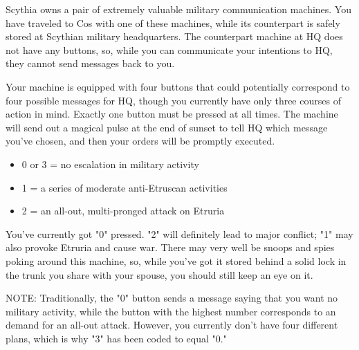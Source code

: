 \documentclass[green]{Kos}
\begin{document}
\name{\gScythiaMachine{}}

Scythia owns a pair of extremely valuable military communication machines. You have traveled to Cos with one of these machines, while its counterpart is safely stored at Scythian military headquarters. The counterpart machine at HQ does not have any buttons, so, while you can communicate your intentions to HQ, they cannot send messages back to you. 

Your machine is equipped with four buttons that could potentially correspond to four possible messages for HQ, though you currently have only three courses of action in mind. Exactly one button must be pressed at all times. The machine will send out a magical pulse at the end of sunset to tell HQ which message you've chosen, and then your orders will be promptly executed.

\begin{itemize}
\item 0 or 3 = no escalation in military activity
\item 1 = a series of moderate anti-Etruscan activities
\item 2 = an all-out, multi-pronged attack on Etruria
\end{itemize}

You've currently got "0" pressed. "2" will definitely lead to major conflict; "1" may also provoke Etruria and cause war. There may very well be snoops and spies poking around this machine, so, while you've got it stored behind a solid lock in the trunk you share with your spouse, you should still keep an eye on it.

NOTE: Traditionally, the "0" button sends a message saying that you want no military activity, while the button with the highest number corresponds to an demand for an all-out attack. However, you currently don't have four different plans, which is why "3" has been coded to equal "0."
\end{document}
